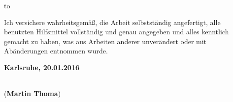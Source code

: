 \cleardoublepage%
\vspace*{30\baselineskip}
\hbox to \textwidth{\hrulefill} %
\par
Ich versichere wahrheitsgemäß, die Arbeit
selbstständig angefertigt, alle benutzten Hilfsmittel vollständig und genau
angegeben und alles kenntlich gemacht zu haben, was aus Arbeiten anderer
unverändert oder mit Abänderungen entnommen wurde.

\textbf{Karlsruhe, 20.01.2016}
\vspace{1.5cm}

\dotfill\hspace*{8.0cm}\\
\hspace*{0.5cm} (\textbf{Martin Thoma}) %

\thispagestyle{empty}
\clearpage